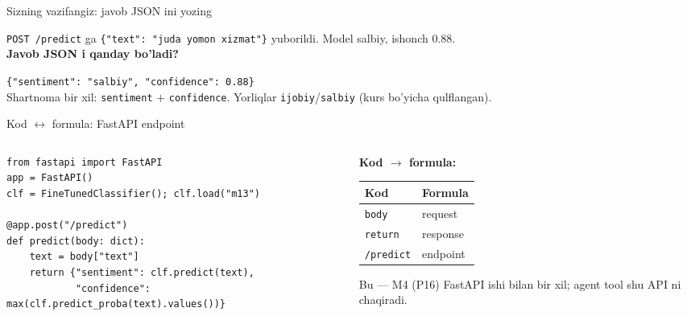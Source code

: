 \documentclass[aspectratio=169,11pt]{beamer}
\begin{document}
\begin{frame}{Sizning vazifangiz: javob JSON ini yozing}
  \begin{tcolorbox}[warnbox,title=Savol --- 60 soniya]
    \small
    \texttt{POST /predict} ga \texttt{\{"text": "juda yomon xizmat"\}} yuborildi.
    Model salbiy, ishonch $0.88$.\\[4pt]
    \textbf{Javob JSON i qanday bo'ladi?}
  \end{tcolorbox}
  \pause
  \begin{tcolorbox}[okbox,title=Javob]
    \small
    \texttt{\{"sentiment": "salbiy", "confidence": 0.88\}}\\[3pt]
    \footnotesize Shartnoma bir xil: \texttt{sentiment} $+$ \texttt{confidence}.
    Yorliqlar \texttt{ijobiy}/\texttt{salbiy} (kurs bo'yicha qulflangan).
  \end{tcolorbox}
\end{frame}

\begin{frame}[fragile]{Kod $\leftrightarrow$ formula: FastAPI endpoint}
  \begin{columns}[T]
    \begin{column}{0.58\textwidth}
\begin{lstlisting}
from fastapi import FastAPI
app = FastAPI()
clf = FineTunedClassifier(); clf.load("m13")

@app.post("/predict")
def predict(body: dict):
    text = body["text"]
    return {"sentiment": clf.predict(text),
            "confidence": max(clf.predict_proba(text).values())}
\end{lstlisting}
    \end{column}
    \begin{column}{0.38\textwidth}
      \textbf{Kod $\to$ formula:}\\[3pt]
      \footnotesize
      \begin{tabular}{p{1.7cm}p{2.0cm}}
        \toprule
        Kod & Formula \\
        \midrule
        \texttt{body} & request \\
        \texttt{return} & response \\
        \texttt{/predict} & endpoint \\
        \bottomrule
      \end{tabular}
      \vspace{4pt}
      \begin{tcolorbox}[okbox,top=2pt,bottom=2pt]
        \footnotesize
        Bu --- M4 (P16) FastAPI ishi bilan bir xil; agent tool shu API ni chaqiradi.
      \end{tcolorbox}
    \end{column}
  \end{columns}
\end{frame}
\end{document}

